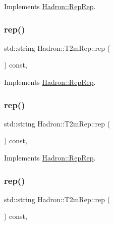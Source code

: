 Implements \mbox{\hyperlink{structHadron_1_1RepRep_ab3213025f6de249f7095892109575fde}{Hadron\+::\+Rep\+Rep}}.

\mbox{\label{structHadron_1_1T2mRep_a7b3ba7f0e39ae3d4f8f377ab928fafee}} 
\subsubsection{\texorpdfstring{rep()}{rep()}\hspace{0.1cm}{\footnotesize\ttfamily [3/5]}}
{\footnotesize\ttfamily std\+::string Hadron\+::\+T2m\+Rep\+::rep (\begin{DoxyParamCaption}{ }\end{DoxyParamCaption}) const\hspace{0.3cm}{\ttfamily [inline]}, {\ttfamily [virtual]}}



Implements \mbox{\hyperlink{structHadron_1_1RepRep_ab3213025f6de249f7095892109575fde}{Hadron\+::\+Rep\+Rep}}.

\mbox{\label{structHadron_1_1T2mRep_a7b3ba7f0e39ae3d4f8f377ab928fafee}} 
\subsubsection{\texorpdfstring{rep()}{rep()}\hspace{0.1cm}{\footnotesize\ttfamily [4/5]}}
{\footnotesize\ttfamily std\+::string Hadron\+::\+T2m\+Rep\+::rep (\begin{DoxyParamCaption}{ }\end{DoxyParamCaption}) const\hspace{0.3cm}{\ttfamily [inline]}, {\ttfamily [virtual]}}



Implements \mbox{\hyperlink{structHadron_1_1RepRep_ab3213025f6de249f7095892109575fde}{Hadron\+::\+Rep\+Rep}}.

\mbox{\label{structHadron_1_1T2mRep_a7b3ba7f0e39ae3d4f8f377ab928fafee}} 
\subsubsection{\texorpdfstring{rep()}{rep()}\hspace{0.1cm}{\footnotesize\ttfamily [5/5]}}
{\footnotesize\ttfamily std\+::string Hadron\+::\+T2m\+Rep\+::rep (\begin{DoxyParamCaption}{ }\end{DoxyParamCaption}) const\hspace{0.3cm}{\ttfamily [inline]}, {\ttfamily [virtual]}}




